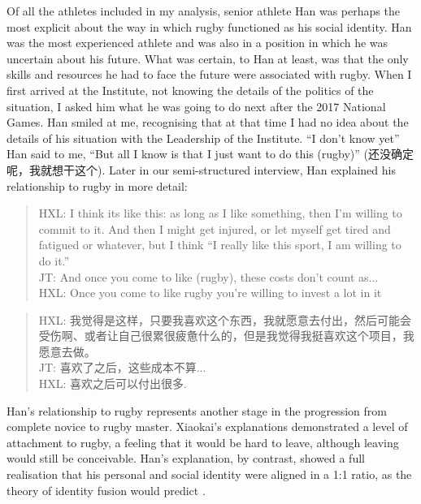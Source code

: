 \begin{CJK}{UTF8}{gbsn}
Of all the athletes included in my analysis, senior athlete Han was perhaps the most explicit about the way in which rugby functioned as his social identity.  Han was the most experienced athlete and was also in a position in which he was uncertain about his future. What was certain, to Han at least, was that the only skills and resources he had to face the future were associated with rugby.   When I first arrived at the Institute, not knowing the details of the politics of the situation, I asked him what he was going to do next after the 2017 National Games.  Han smiled at me, recognising that at that time I had no idea about the details of his situation with the Leadership of the Institute. ``I don't know yet'' Han said to me, ``But all I know is that I just want to do this (rugby)'' (还没确定呢，我就想干这个).  Later in our semi-structured interview, Han explained his relationship to rugby in more detail:

    \begin{quotation}
      HXL: I think its like this: as long as I like something, then I’m willing to commit to it.  And then I might get injured, or let myself get tired and fatigued or whatever, but I think ``I really like this sport, I am willing to do it.''\\
      JT: And once you come to like (rugby), these costs don't count as...\\
      HXL: Once you come to like rugby you're willing to invest a lot in it
    \end{quotation}

    \begin{quotation}
      HXL: 我觉得是这样，只要我喜欢这个东西，我就愿意去付出，然后可能会受伤啊、或者让自己很累很疲惫什么的，但是我觉得我挺喜欢这个项目，我愿意去做。\\
      JT: 喜欢了之后，这些成本不算...\\
      HXL: 喜欢之后可以付出很多.
    \end{quotation}

Han's relationship to rugby represents another stage in the progression from complete novice to rugby master.  Xiaokai's explanations demonstrated a level of attachment to rugby, a feeling that it would be hard to leave, although leaving would still be conceivable. Han's explanation, by contrast, showed a full realisation that his personal and social identity were aligned in a 1:1 ratio, as the theory of identity fusion would predict \cite{Swann2015}.


\end{CJK}
